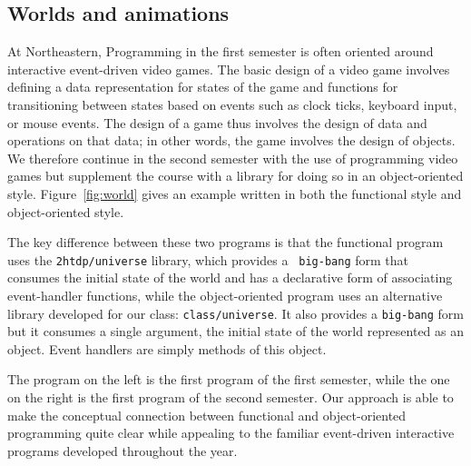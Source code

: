 \documentclass[submission,copyright]{eptcs}
\begin{document}



\subsection{Worlds and animations}

At Northeastern, Programming in the first semester is often oriented
around interactive event-driven video games.  The basic design of a
video game involves defining a data representation for states of the
game and functions for transitioning between states based on events
such as clock ticks, keyboard input, or mouse events.  The design of a
game thus involves the design of data and operations on that data; in
other words, the game involves the design of objects.  We therefore
continue in the second semester with the use of programming video
games but supplement the course with a library for doing so in an
object-oriented style.  Figure~\ref{fig:world} gives an example
written in both the functional style and object-oriented style.

The key difference between these two programs is that the functional
program uses the {\tt 2htdp/universe} library, which provides a {\tt
  big-bang} form that consumes the initial state of the world and has
a declarative form of associating event-handler functions, while the
object-oriented program uses an alternative library developed for our
class: {\tt class/universe}.  It also provides a {\tt big-bang} form
but it consumes a single argument, the initial state of the world
represented as an object.  Event handlers are simply methods of this
object.

The program on the left is the first program of the first semester,
while the one on the right is the first program of the second
semester.  Our approach is able to make the conceptual connection
between functional and object-oriented programming quite clear while
appealing to the familiar event-driven interactive programs developed
throughout the year.
\end{document}
